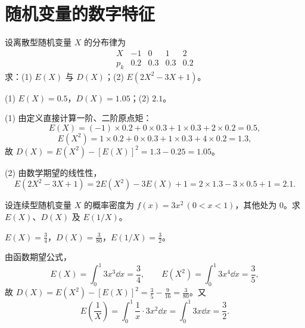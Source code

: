 %
%
\section{随机变量的数字特征}

\begin{exercise}
设离散型随机变量 $X$ 的分布律为
\[
\begin{array}{c|cccc}
  X & -1 & 0 & 1 & 2 \\ \hline
  p_k & 0.2 & 0.3 & 0.3 & 0.2
\end{array}
\]
求：(1) $E(X)$ 与 $D(X)$；(2) $E(2X^2-3X+1)$。
\begin{answer}
(1) $E(X)=0.5$，$D(X)=1.05$；(2) $2.1$。
\end{answer}
\begin{solution}
(1) 由定义直接计算一阶、二阶原点矩：
\[
  E(X)=(-1)\times 0.2+0\times 0.3+1\times 0.3+2\times 0.2=0.5,
\]
\[
  E(X^2)=1\times 0.2+0\times 0.3+1\times 0.3+4\times 0.2=1.3,
\]
故 $D(X)=E(X^2)-[E(X)]^2=1.3-0.25=1.05$。

(2) 由数学期望的线性性，
\[
  E(2X^2-3X+1)=2E(X^2)-3E(X)+1=2\times 1.3-3\times 0.5+1=2.1.
\]
\end{solution}
\end{exercise}

\begin{exercise}
设连续型随机变量 $X$ 的概率密度为 $f(x)=3x^2\,(0<x<1)$，其他处为 $0$。求 $E(X)$、$D(X)$ 及 $E(1/X)$。
\begin{answer}
$E(X)=\frac{3}{4}$，$D(X)=\frac{3}{80}$，$E(1/X)=\frac{3}{2}$。
\end{answer}
\begin{solution}
由函数期望公式，
\[
  E(X)=\int_{0}^{1}3x^3\dd x=\frac{3}{4},\qquad
  E(X^2)=\int_{0}^{1}3x^4\dd x=\frac{3}{5},
\]
故 $D(X)=E(X^2)-[E(X)]^2=\frac{3}{5}-\frac{9}{16}=\frac{3}{80}$。又
\[
  E\!\left(\frac{1}{X}\right)=\int_{0}^{1}\frac{1}{x}\cdot 3x^2\dd x=\int_{0}^{1}3x\dd x=\frac{3}{2}.
\]
\end{solution}
\end{exercise}

